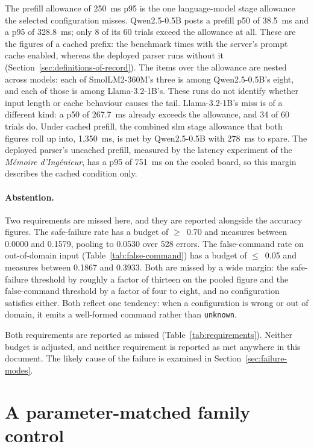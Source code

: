 The prefill allowance of 250~ms p95 is the one language-model stage allowance the selected
configuration misses. Qwen2.5-0.5B posts a prefill p50 of 38.5~ms and a p95 of 328.8~ms; only 8 of
its 60 trials exceed the allowance at all. These are the figures of a cached prefix: the benchmark
times with the server's prompt cache enabled, whereas the deployed parser runs without it
(Section~\ref{sec:definitions-of-record}). The items over the allowance are nested across models:
each of SmolLM2-360M's three is among Qwen2.5-0.5B's eight, and each of those is among
Llama-3.2-1B's. These runs do not identify whether input length or cache behaviour causes the
tail.
Llama-3.2-1B's miss is of a different kind: a p50 of 267.7~ms already exceeds the allowance, and 34
of 60 trials do. Under cached prefill, the combined \gls{slm} stage allowance that both figures roll
up into, 1{,}350~ms, is met by Qwen2.5-0.5B with 278~ms to spare. The deployed parser's uncached
prefill, measured by the latency experiment of the \emph{M\'emoire d'Ing\'enieur}, has a p95 of
751~ms on the cooled board, so this margin describes the cached condition only.

\paragraph{Abstention.} Two requirements are missed here, and they are reported alongside the
accuracy figures. The safe-failure rate has a budget of $\geq$~0.70 and measures between 0.0000 and
0.1579, pooling to 0.0530 over 528 errors. The false-command rate on out-of-domain input
(Table~\ref{tab:false-command}) has a budget of $\leq$~0.05 and measures between 0.1867 and 0.3933.
Both are missed by a wide margin: the safe-failure threshold by roughly a factor of thirteen on the
pooled figure and the false-command threshold by a factor of four to eight, and no configuration
satisfies either. Both reflect one tendency: when a configuration is wrong or out of domain, it
emits a well-formed command rather than \texttt{unknown}.



Both requirements are reported as missed (Table~\ref{tab:requirements}). Neither budget is
adjusted, and neither requirement is reported as met anywhere in this document. The likely cause of
the failure is examined in Section~\ref{sec:failure-modes}.

\clearpage
\section{A parameter-matched family control}
\label{sec:iso-parameter}


